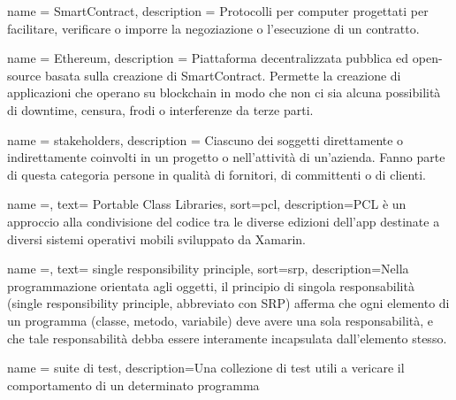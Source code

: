 {
	name = {SmartContract},
	description = { Protocolli per computer progettati per facilitare, verificare o imporre la negoziazione o l'esecuzione di un
			contratto.
		}
}

{
	name = {Ethereum},
	description = { Piattaforma decentralizzata pubblica ed open-source basata sulla creazione di
			SmartContract. Permette la creazione di applicazioni che operano su blockchain
			in modo che non ci sia alcuna possibilità di downtime, censura, frodi o interferenze
			da terze parti.
		}
}

{
	name = {stakeholders},
	description = { Ciascuno dei soggetti direttamente o indirettamente coinvolti in un progetto o nell'attività di un'azienda.
			Fanno parte di questa categoria persone in qualità di fornitori, di committenti o di clienti.
		}
}



{
    name =,
    text= Portable Class Libraries,
    sort=pcl,
    description={PCL è un approccio alla condivisione del codice tra le diverse edizioni dell’app destinate a diversi sistemi operativi mobili sviluppato da Xamarin.}
}


{
    name =,
    text= single responsibility principle,
    sort=srp,
    description={Nella programmazione orientata agli oggetti, il principio di singola responsabilità (single responsibility principle, abbreviato con SRP) afferma che ogni elemento di un programma (classe, metodo, variabile) deve avere una sola responsabilità, e che tale responsabilità debba essere interamente incapsulata dall'elemento stesso.}
}




{
    name = {suite di test},
    description={Una collezione di test utili a vericare il comportamento di un determinato programma}
}
